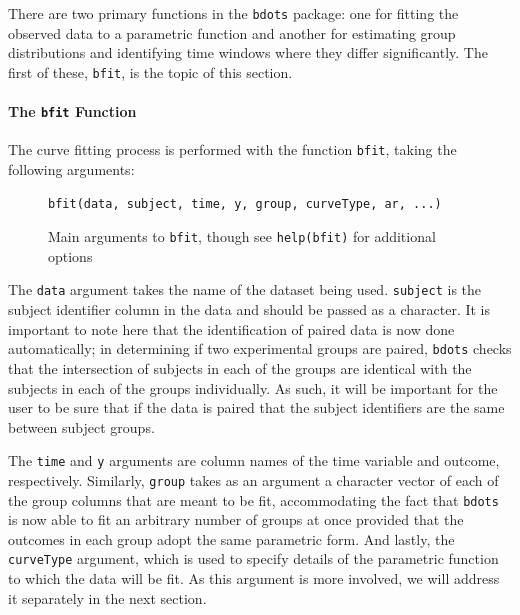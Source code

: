 \documentclass{article}
\newcommand{\xt}{\texttt}%
\begin{document}
There are two primary functions in the \xt{bdots} package: one for fitting the observed data to a parametric function and another for estimating group distributions and identifying time windows where they differ significantly. The first of these, \xt{bfit}, is the topic of this section.


\paragraph{The \xt{bfit} Function}

The curve fitting process is performed with the function \texttt{bfit}, taking the following arguments:


\begin{figure}[h!]
\centering
\begin{BVerbatim}
bfit(data, subject, time, y, group, curveType, ar, ...)
\end{BVerbatim}
\caption{Main arguments to \xt{bfit}, though see \xt{help(bfit)} for additional options}
\end{figure}

The \xt{data} argument takes the name of the dataset being used. \xt{subject} is the subject identifier column in the data and should be passed as a character. It is important to note here that the identification of paired data is now done automatically; in determining if two experimental groups are paired, \xt{bdots} checks that the intersection of subjects in each of the groups are identical with the subjects in each of the groups individually. As such, it will be important for the user to be sure that if the data is paired that the subject identifiers are the same between subject groups. 

The \xt{time} and \xt{y} arguments are column names of the time variable and outcome, respectively. Similarly, \xt{group} takes as an argument a character vector of each of the group columns that are meant to be fit, accommodating the fact that \xt{bdots} is now able to fit an arbitrary number of groups at once provided that the outcomes in each group adopt the same parametric form. And lastly, the \xt{curveType} argument, which is used to specify details of the parametric function to which the data will be fit. As this argument is more involved, we will address it separately in the next section.
\end{document}

